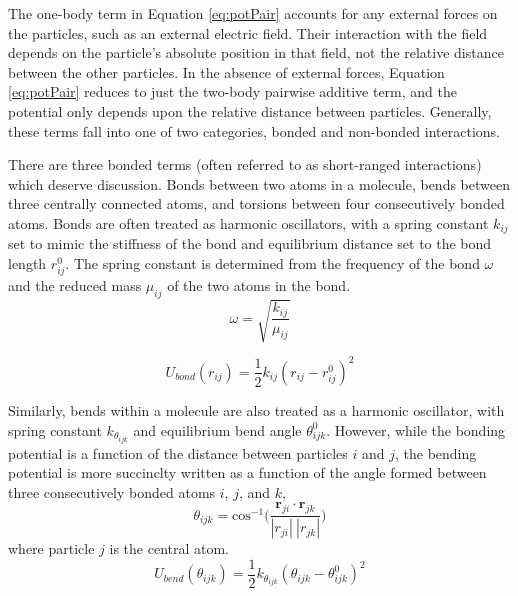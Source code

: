 The one-body term in Equation \eqref{eq:potPair} accounts for any
external forces on the particles, such as an external electric
field. Their interaction with the field depends on the particle's
absolute position in that field, not the relative distance between the
other particles. In the absence of external forces, Equation
\eqref{eq:potPair} reduces to just the two-body pairwise additive
term, and the potential only depends upon the relative distance
between particles. Generally, these terms fall into one of two
categories, bonded and non-bonded interactions.

There are three bonded terms (often referred to as short-ranged
interactions) which deserve discussion. Bonds between two atoms in a
molecule, bends between three centrally connected atoms, and torsions
between four consecutively bonded atoms. Bonds are often treated as
harmonic oscillators, with a spring constant $k_{ij}$ set to mimic the
stiffness of the bond and equilibrium distance set to the bond length
$r_{ij}^0$. The spring constant is determined from the frequency of
the bond $\omega$ and the reduced mass $\mu_{ij}$ of the two atoms in the
bond.
\begin{equation}\label{eq:kij}
\omega = \sqrt{\frac{k_{ij}}{\mu_{ij}} }
\end{equation}

\begin{equation}\label{eq:bonds}
U_{bond}(r_{ij}) = \frac{1}{2} k_{ij} (r_{ij} -r_{ij}^0)^2
\end{equation}

Similarly, bends within a molecule are also treated as a harmonic
oscillator, with spring constant $k_{\theta_{ijk}}$ and equilibrium bend
angle $\theta_{ijk}^0$. However, while the bonding potential is a
function of the distance between particles $i$ and $j$, the bending
potential is more succinclty written as a function of the angle formed between three
consecutively bonded atoms $i$, $j$, and $k$,
\begin{equation}\label{eq:bend}
\theta_{ijk} = \mathrm{cos}^{-1}\Bigg(\frac{\mathbf{r}_{ji} \cdot
  \mathbf{r}_{jk}}{|r_{ji}|~|r_{jk}|}\Bigg)
\end{equation}
where particle $j$ is the central atom. 
\begin{equation}\label{eq:bend2}
U_{bend}(\theta_{ijk}) = \frac{1}{2} k_{\theta_{ijk}} (\theta_{ijk} -
\theta_{ijk}^0)^2
\end{equation}

